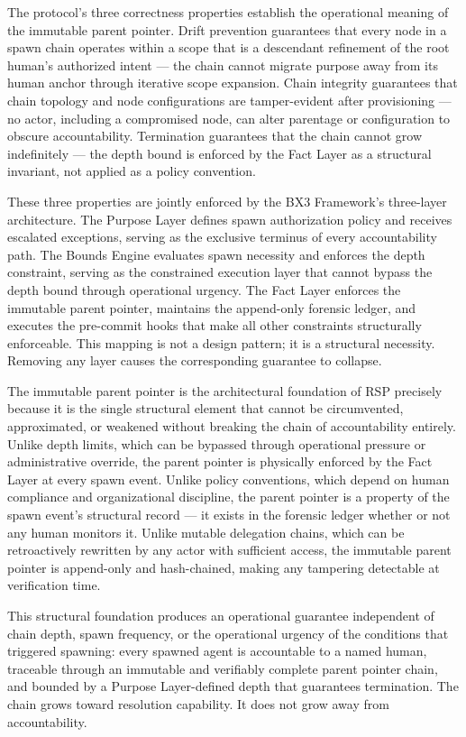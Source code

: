 The protocol's three correctness properties establish the operational meaning of the immutable parent pointer. Drift prevention guarantees that every node in a spawn chain operates within a scope that is a descendant refinement of the root human's authorized intent --- the chain cannot migrate purpose away from its human anchor through iterative scope expansion. Chain integrity guarantees that chain topology and node configurations are tamper-evident after provisioning --- no actor, including a compromised node, can alter parentage or configuration to obscure accountability. Termination guarantees that the chain cannot grow indefinitely --- the depth bound is enforced by the Fact Layer as a structural invariant, not applied as a policy convention.

These three properties are jointly enforced by the BX3 Framework's three-layer architecture. The Purpose Layer defines spawn authorization policy and receives escalated exceptions, serving as the exclusive terminus of every accountability path. The Bounds Engine evaluates spawn necessity and enforces the depth constraint, serving as the constrained execution layer that cannot bypass the depth bound through operational urgency. The Fact Layer enforces the immutable parent pointer, maintains the append-only forensic ledger, and executes the pre-commit hooks that make all other constraints structurally enforceable. This mapping is not a design pattern; it is a structural necessity. Removing any layer causes the corresponding guarantee to collapse.

The immutable parent pointer is the architectural foundation of RSP precisely because it is the single structural element that cannot be circumvented, approximated, or weakened without breaking the chain of accountability entirely. Unlike depth limits, which can be bypassed through operational pressure or administrative override, the parent pointer is physically enforced by the Fact Layer at every spawn event. Unlike policy conventions, which depend on human compliance and organizational discipline, the parent pointer is a property of the spawn event's structural record --- it exists in the forensic ledger whether or not any human monitors it. Unlike mutable delegation chains, which can be retroactively rewritten by any actor with sufficient access, the immutable parent pointer is append-only and hash-chained, making any tampering detectable at verification time.

This structural foundation produces an operational guarantee independent of chain depth, spawn frequency, or the operational urgency of the conditions that triggered spawning: every spawned agent is accountable to a named human, traceable through an immutable and verifiably complete parent pointer chain, and bounded by a Purpose Layer-defined depth that guarantees termination. The chain grows toward resolution capability. It does not grow away from accountability.

